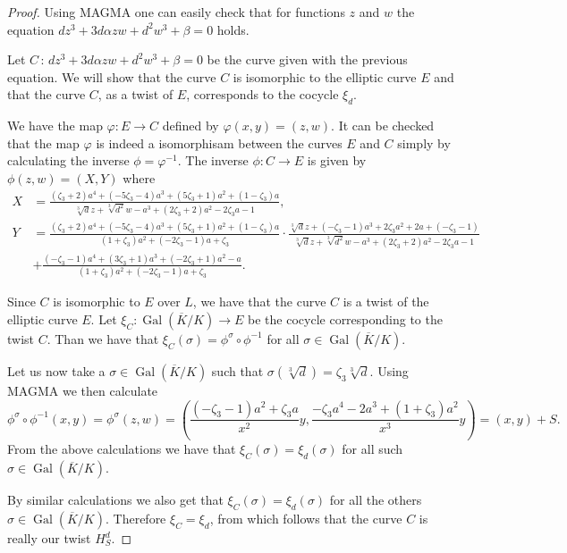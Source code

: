 \documentclass[a4paper, 12pt]{amsart}
\theoremstyle{definition}
\theoremstyle{remark}
\newcommand{\GalK}{\operatorname{Gal}(\overline{K}/K)}
\numberwithin{equation}{section}
\begin{document}
\begin{proof}
    Using MAGMA one can easily check that for functions $z$ and $w$ the equation $dz^3+3d\alpha zw+d^2w^3+\beta=0$ holds. 

    Let $C \,:\, dz^3+3d\alpha zw+d^2w^3+\beta=0$ be the curve given with the previous equation. We will show that the curve $C$ is isomorphic to the elliptic curve $E$ and that the curve $C$, as a twist of $E$, corresponds to the cocycle $\xi_d$.

    We have the map $\varphi : E \to C$ defined by $\varphi(x,y)=(z,w)$. It can be checked that the map $\varphi$ is indeed a isomorphisam between the curves $E$ and $C$ simply by calculating the inverse $\phi=\varphi^{-1}$. The inverse $\phi : C \to E$ is given by $\phi(z,w)=(X,Y)$ where
    \begin{align*}
        X &= \frac{(\zeta_3+2)a^4+(-5\zeta_3-4)a^3+(5\zeta_3+1)a^2+(1-\zeta_3)a}{\sqrt[3]{d}z+\sqrt[3]{d^2}w-a^3+(2\zeta_3+2)a^2-2\zeta_3a-1},\\
        Y &= \frac{(\zeta_3+2)a^4+(-5\zeta_3-4)a^3+(5\zeta_3+1)a^2+(1-\zeta_3)a}{(1+\zeta_3)a^2+(-2\zeta_3-1)a+\zeta_3}\cdot \frac{\sqrt[3]{d}z+(-\zeta_3-1)a^3+2\zeta_3a^2+2a+(-\zeta_3-1)}{\sqrt[3]{d}z+\sqrt[3]{d^2}w-a^3+(2\zeta_3+2)a^2-2\zeta_3a-1} \\
         & + \frac{(-\zeta_3-1)a^4+(3\zeta_3+1)a^3+(-2\zeta_3+1)a^2-a}{(1+\zeta_3)a^2+(-2\zeta_3-1)a+\zeta_3}.
    \end{align*}

    Since $C$ is isomorphic to $E$ over $L$, we have that the curve $C$ is a twist of the elliptic curve $E$. Let $\xi_C : \GalK \to E$ be the cocycle corresponding to the twist $C$. Than we have that $\xi_C(\sigma) = \phi^\sigma \circ \phi^{-1}$ for all $\sigma \in \GalK$.

    Let us now take a $\sigma \in \GalK$ such that $\sigma(\sqrt[3]{d})= \zeta_3 \sqrt[3]{d}$. Using MAGMA we then calculate
    \[
        \phi^\sigma \circ \phi^{-1} (x,y) = \phi^\sigma(z,w) = \left(\frac{(-\zeta_3-1)a^2+\zeta_3a}{x^2}y, \frac{-\zeta_3a^4-2a^3+(1+\zeta_3)a^2}{x^3}y\right)=(x,y)+S.
    \]
    From the above calculations we have that $\xi_C(\sigma)=\xi_d(\sigma)$ for all such $\sigma \in \GalK$.

    By similar calculations we also get that $\xi_C(\sigma)=\xi_d(\sigma)$ for all the others $\sigma \in \GalK$. Therefore $\xi_C=\xi_d$, from which follows that the curve $C$ is really our twist $H_S^d$.  
\end{proof}
\end{document}
